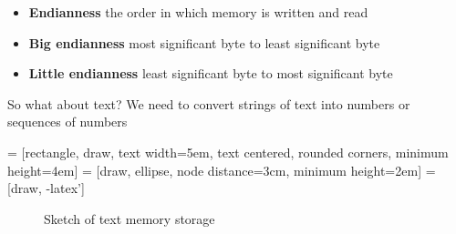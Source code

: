 \documentclass[../index.tex]{subfiles}
\begin{document}
\begin{frame}{\currenttitle}
  \begin{itemize}[leftmargin=*]
    \item[] \textbf{Endianness} \textendash{} the order in which memory is written and read \\
    \item[] \textbf{Big endianness} \textendash{} most significant byte to least significant byte \\
    \item[] \textbf{Little endianness} \textendash{} least significant byte to most significant byte
  \end{itemize}
\end{frame}

\renewcommand{\currenttitle}{So what about text?}
\begin{frame}{\currenttitle}
%
%
  We need to convert strings of text into numbers or sequences of numbers

  \vspace*{2em}

   = [rectangle, draw, text width=5em,%
                       text centered, rounded corners, minimum height=4em]
   = [draw, ellipse, node distance=3cm, minimum height=2em]
   = [draw, -latex']
  \begin{center}
    \begin{figure}
      \caption{Sketch of text memory storage}
    \end{figure}
  \end{center}
\end{frame}


\end{document}
